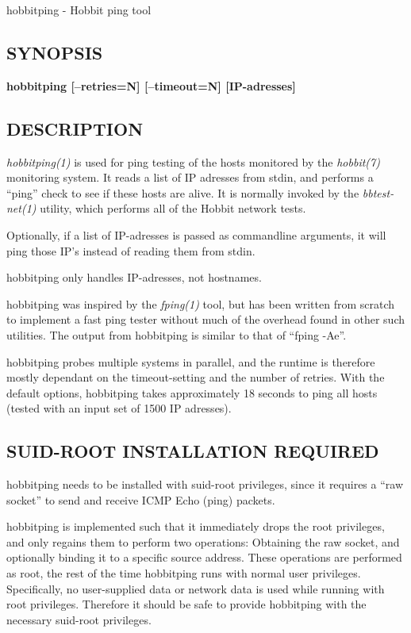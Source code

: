  hobbitping - Hobbit ping tool
 \subsection{SYNOPSIS}
\textbf{hobbitping [--retries=N] [--timeout=N] [IP-adresses]}


 
\subsection{DESCRIPTION}
\emph{hobbitping(1)}
 is used for ping testing of the hosts monitored by the
 \emph{hobbit(7)} monitoring system. It reads a list of IP adresses
 from stdin, and performs a ``ping'' check to see if these hosts are
 alive. It is normally invoked by the \emph{bbtest-net(1)} utility,
 which performs all of the Hobbit network tests. 


  Optionally, if a list of IP-adresses is passed as commandline
  arguments, it will ping those IP's instead of reading them from
  stdin. 



  hobbitping only handles IP-adresses, not hostnames. 


  hobbitping was inspired by the \emph{fping(1)} tool, but has been
  written from scratch to implement a fast ping tester without much of
  the overhead found in other such utilities. The output from
  hobbitping is similar to that of ``fping -Ae''. 



  hobbitping probes multiple systems in parallel, and the runtime is
  therefore mostly dependant on the timeout-setting and the number of
  retries. With the default options, hobbitping takes approximately 18
  seconds to ping all hosts (tested with an input set of 1500 IP
  adresses). 



 
\subsection{SUID-ROOT INSTALLATION REQUIRED}
 hobbitping needs to be installed with suid-root privileges, since it
 requires a ``raw socket'' to send and receive ICMP Echo (ping)
 packets. 


  hobbitping is implemented such that it immediately drops the root
  privileges, and only regains them to perform two operations:
  Obtaining the raw socket, and optionally binding it to a specific
  source address. These operations are performed as root, the rest of
  the time hobbitping runs with normal user privileges. Specifically,
  no user-supplied data or network data is used while running with
  root privileges. Therefore it should be safe to provide hobbitping
  with the necessary suid-root privileges. 



